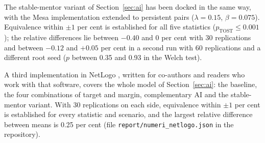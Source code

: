 \documentclass[preprint,12pt,authoryear]{elsarticle}
\begin{document}
\begin{table}[h]\centering\small
\caption{Docking: vectorised (NumPy) vs.\ object-based (Mesa) implementation ($N=5{,}000$, 30 replications each).}\label{tab:docking}
\end{table}

The stable-mentor variant of Section~\ref{sec:ai} has been docked in the same way, with the Mesa implementation extended to persistent pairs ($\lambda=0.15$, $\beta=0.075$). Equivalence within $\pm1$ per cent is established for all five statistics ($p_{\mathrm{TOST}}\le0.001$); the relative differences lie between $-0.40$ and $0$ per cent with 30 replications and between $-0.12$ and $+0.05$ per cent in a second run with 60 replications and a different root seed ($p$ between 0.35 and 0.93 in the Welch test).

A third implementation in NetLogo \citep{Wilensky1999}, written for co-authors and readers who work with that software, covers the whole model of Section~\ref{sec:ai}: the baseline, the four combinations of target and margin, complementary AI and the stable-mentor variant. With 30 replications on each side, equivalence within $\pm1$ per cent is established for every statistic and scenario, and the largest relative difference between means is 0.25 per cent (file \texttt{report/numeri\_netlogo.json} in the repository).



\end{document}

